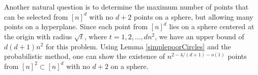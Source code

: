 \documentclass[11pt]{article}
\theoremstyle{plain}
\theoremstyle{definition}
\theoremstyle{remark}
\begin{document}




Another natural question is to determine the maximum number of points that can be selected from $[n]^d$ with no $d+2$ points on a sphere, but allowing many points on a hyperplane.  Since each point from $[n]^d$ lies on a sphere centered at the origin with radius $\sqrt{t}$, where $t  = 1,2,\ldots, dn^2$, we have an upper bound of $d(d+1)n^2$ for this problem. Using Lemma \ref{simplepoorCircles} and the probabilistic method, one can show the existence of $n^{2 - 4/(d+1) - o(1)}$ points from $[n]^2 \subset [n]^d$ with no $d+2$ on a sphere.   
\end{document}
